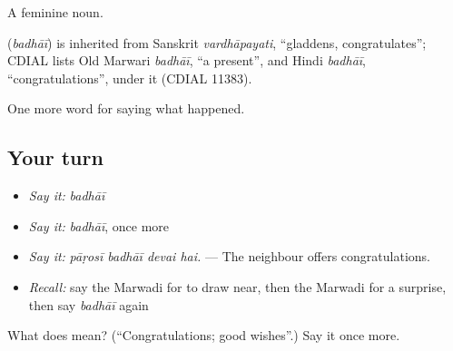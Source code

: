 A feminine noun.

\begin{cousinweb}
\textbf{} (\emph{badhāī}) is inherited from Sanskrit \emph{vardhāpayati}, \textquotedblleft{}gladdens, congratulates\textquotedblright{}; CDIAL lists Old Marwari \emph{badhāī}, \textquotedblleft{}a present\textquotedblright{}, and Hindi \emph{badhāī}, \textquotedblleft{}congratulations\textquotedblright{}, under it (CDIAL 11383).
\end{cousinweb}

\begin{grammarlens}[title={What you've built}]
One more word for saying what happened.
\end{grammarlens}

\subsection*{Your turn}
\begin{itemize}
\raggedright
  \item \emph{Say it:} \emph{badhāī}
  \item \emph{Say it:} \emph{badhāī}, once more
  \item \emph{Say it:} \emph{pāṛosī badhāī devai hai.} — The neighbour offers congratulations.
  \item \emph{Recall:} say the Marwadi for to draw near, then the Marwadi for a surprise, then say \emph{badhāī} again
\end{itemize}

\begin{tcolorbox}[breakable,colback=teal!4,colframe=teal!35!black,title={Before you move on}]
What does  mean? (\textquotedblleft{}Congratulations; good wishes\textquotedblright{}.) Say it once more.
\end{tcolorbox}
